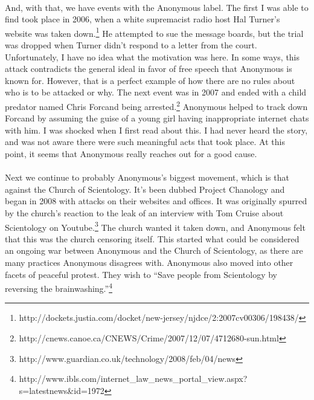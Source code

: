 \documentclass{article}
\begin{document}
\paragraph{}
And, with that, we have events with the Anonymous label.  The first I was able to
find took place in 2006, when a white supremacist radio host Hal Turner's website
was taken down.\footnote{
http://dockets.justia.com/docket/new-jersey/njdce/2:2007cv00306/198438/}
He attempted to sue the message boards, but the trial was dropped
when Turner didn't respond to a letter from the court.  Unfortunately, I have
no idea what the motivation was here.  In some ways, this attack contradicts the
general ideal in favor of free speech that Anonymous is known for.  However, that
is a perfect example of how there are no rules about who is to be attacked or why.
The next event was in 2007 and ended with a child predator named Chris Forcand
being arrested.\footnote{
http://cnews.canoe.ca/CNEWS/Crime/2007/12/07/4712680-sun.html}
Anonymous helped to track down Forcand by assuming the guise of a
young girl having inappropriate internet chats with him.  I was shocked when I
first read about this.  I had never heard the story, and was not aware there were
such meaningful acts that took place.  At this point, it seems that Anonymous
really reaches out for a good cause.

\paragraph{}
Next we continue to probably Anonymous's biggest movement, which is that against
the Church of Scientology. It's been dubbed Project Chanology and began in 2008
with attacks on their websites and offices.  It was originally spurred by the
church's reaction to the leak of an interview with Tom Cruise about Scientology
on Youtube.\footnote{
http://www.guardian.co.uk/technology/2008/feb/04/news}
The church wanted it taken down, and Anonymous felt that this was the church
censoring itself.  This started what could be considered an ongoing war between
Anonymous and the Church of Scientology, as there are many practices Anonymous
disagrees with.  Anonymous also moved into other facets of peaceful protest.
They wish to ``Save people from Scientology by reversing the 
brainwashing.''\footnote{
http://www.ibls.com/internet\_law\_news\_portal\_view.aspx?s=latestnews\&id=1972}

\end{document}
